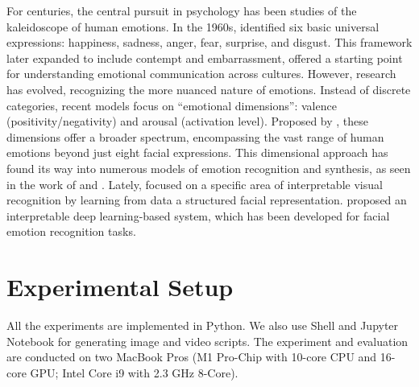 For centuries, the central pursuit in psychology has been studies of the kaleidoscope of human emotions.
In the 1960s, \citet{ekman1971constants} identified six basic universal expressions: 
happiness, sadness, anger, fear, surprise, and disgust. 
This framework later expanded to include contempt and embarrassment, 
offered a starting point for understanding emotional communication across cultures.
However, research has evolved, recognizing the more nuanced nature of emotions. 
Instead of discrete categories, 
recent models focus on ``emotional dimensions'': valence (positivity/negativity) and arousal (activation level). 
Proposed by \citet{russell1980circumplex}, 
these dimensions offer a broader spectrum, 
encompassing the vast range of human emotions beyond just eight facial expressions. 
This dimensional approach has found its way into numerous models of emotion recognition and synthesis, 
as seen in the work of \citet{KolliasTBCZ23} and \citet{tottenham2009nimstim}. 
Lately, 
\citet{YinTLS019} focused on a specific area of interpretable visual recognition by learning from data a structured facial representation. 
\citet{Malik0R21} proposed an interpretable deep learning-based system, 
which has been developed for facial emotion recognition tasks. 


\section{Experimental Setup}
\label{sec:setup}

All the experiments are implemented in Python. 
We also use Shell and Jupyter Notebook for generating image and video scripts. 
The experiment and evaluation are conducted on two MacBook Pros 
(M1 Pro-Chip with 10-core CPU and 16-core GPU; Intel Core i9 with 2.3 GHz 8-Core). 

